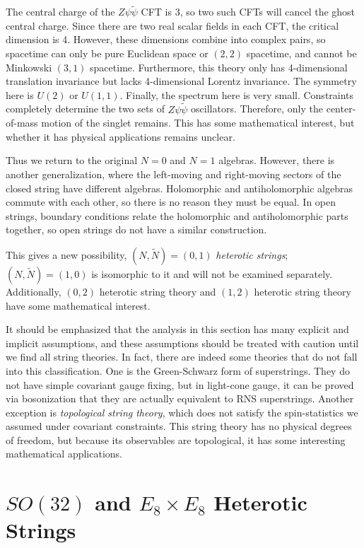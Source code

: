 The central charge of the $Z\psi\tilde{\psi}$ CFT is 3, so two such CFTs will cancel the ghost central charge. Since there are two real scalar fields in each CFT, the critical dimension is 4. However, these dimensions combine into complex pairs, so spacetime can only be pure Euclidean space or $(2,2)$ spacetime, and cannot be Minkowski $(3,1)$ spacetime. Furthermore, this theory only has 4-dimensional translation invariance but lacks 4-dimensional Lorentz invariance. The symmetry here is $U(2)$ or $U(1,1)$. Finally, the spectrum here is very small. Constraints completely determine the two sets of $Z\psi\tilde{\psi}$ oscillators. Therefore, only the center-of-mass motion of the singlet remains. This has some mathematical interest, but whether it has physical applications remains unclear.

Thus we return to the original $N=0$ and $N=1$ algebras. However, there is another generalization, where the left-moving and right-moving sectors of the closed string have different algebras. Holomorphic and antiholomorphic algebras commute with each other, so there is no reason they must be equal. In open strings, boundary conditions relate the holomorphic and antiholomorphic parts together, so open strings do not have a similar construction.

This gives a new possibility, $(N,\tilde{N})=(0,1)$ \emph{heterotic strings}; $(N,\tilde{N})=(1,0)$ is isomorphic to it and will not be examined separately. Additionally, $(0,2)$ heterotic string theory and $(1,2)$ heterotic string theory have some mathematical interest.

It should be emphasized that the analysis in this section has many explicit and implicit assumptions, and these assumptions should be treated with caution until we find all string theories. In fact, there are indeed some theories that do not fall into this classification. One is the Green-Schwarz form of superstrings. They do not have simple covariant gauge fixing, but in light-cone gauge, it can be proved via bosonization that they are actually equivalent to RNS superstrings. Another exception is \emph{topological string theory}, which does not satisfy the spin-statistics we assumed under covariant constraints. This string theory has no physical degrees of freedom, but because its observables are topological, it has some interesting mathematical applications.

\section{$SO(32)$ and $E_{8}\times E_{8}$ Heterotic Strings} \label{sec:11.2}

